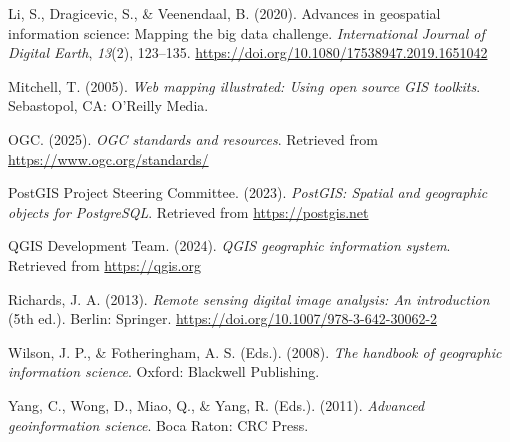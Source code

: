 \documentclass[
  11pt,
  letterpaper,
]{book}
\newlength{\cslhangindent}
\newenvironment{CSLReferences}[2] %
 {\begin{list}{}{%
  \setlength{\itemindent}{0pt}
  \setlength{\leftmargin}{0pt}
  \setlength{\parsep}{0pt}
  \ifodd #1
   \setlength{\leftmargin}{\cslhangindent}
   \setlength{\itemindent}{-1\cslhangindent}
  \fi
  \setlength{\itemsep}{#2\baselineskip}}}
 {\end{list}}
\begin{document}
\begin{CSLReferences}{1}{0}
Li, S., Dragicevic, S., \& Veenendaal, B. (2020). Advances in geospatial
information science: Mapping the big data challenge. \emph{International
Journal of Digital Earth}, \emph{13}(2), 123--135.
\url{https://doi.org/10.1080/17538947.2019.1651042}

Mitchell, T. (2005). \emph{Web mapping illustrated: Using open source
GIS toolkits}. Sebastopol, CA: O'Reilly Media.

OGC. (2025). \emph{OGC standards and resources}. Retrieved from
\url{https://www.ogc.org/standards/}

PostGIS Project Steering Committee. (2023). \emph{PostGIS: Spatial and
geographic objects for PostgreSQL}. Retrieved from
\url{https://postgis.net}

QGIS Development Team. (2024). \emph{QGIS geographic information
system}. Retrieved from \url{https://qgis.org}

Richards, J. A. (2013). \emph{Remote sensing digital image analysis: An
introduction} (5th ed.). Berlin: Springer.
\url{https://doi.org/10.1007/978-3-642-30062-2}

Wilson, J. P., \& Fotheringham, A. S. (Eds.). (2008). \emph{The handbook
of geographic information science}. Oxford: Blackwell Publishing.

Yang, C., Wong, D., Miao, Q., \& Yang, R. (Eds.). (2011). \emph{Advanced
geoinformation science}. Boca Raton: CRC Press.

\end{CSLReferences}


\backmatter
\end{document}
